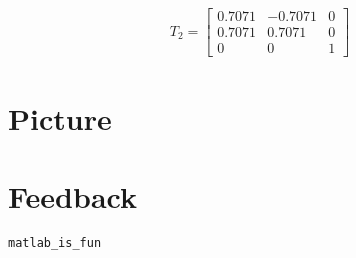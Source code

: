 \documentclass[fleqn]{article}
\begin{document}
\subsection{ }
	\begin{adjustwidth}{4em}{0pt}
	\begin{align*} T_2 = \begin{bmatrix} 0.7071 & -0.7071 & 0\\0.7071 & 0.7071 & 0\\0 & 0 & 1 \end{bmatrix} \end{align*}
	\end{adjustwidth}


\section{Picture}

\section{Feedback}
	\begin{adjustwidth}{2em}{0pt}
	\texttt{matlab\_is\_fun}
	\end{adjustwidth}
\end{document}

